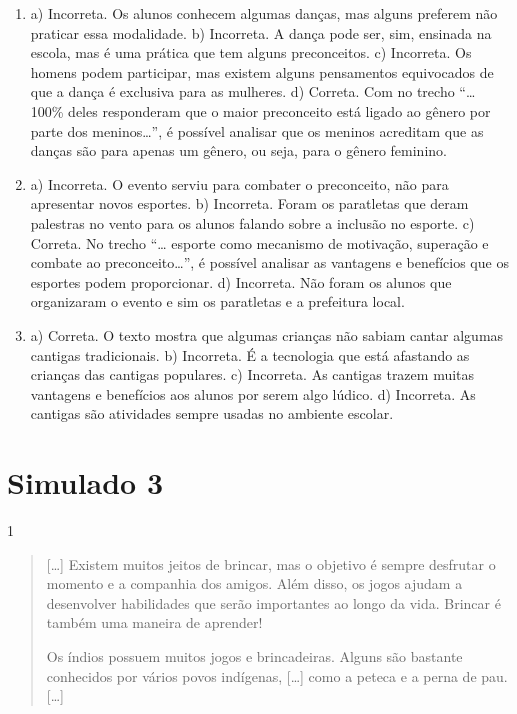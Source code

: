 

\begin{enumerate}

\item
a) Incorreta. Os alunos conhecem algumas danças, mas alguns preferem não praticar essa modalidade.
b) Incorreta. A dança pode ser, sim, ensinada na escola, mas é uma
prática que tem alguns preconceitos.
c) Incorreta. Os homens podem participar, mas existem alguns
pensamentos equivocados de que a dança é exclusiva para as mulheres.
d) Correta. Com no trecho “\ldots{} 100\% deles responderam que o maior
preconceito está ligado ao gênero por parte dos meninos\ldots{}”, é possível
analisar que os meninos acreditam que as danças são para apenas um
gênero, ou seja, para o gênero feminino.

\item
a) Incorreta. O evento serviu para combater o preconceito, não
para apresentar novos esportes.
b) Incorreta. Foram os paratletas que deram palestras no vento
para os alunos falando sobre a inclusão no esporte.
c) Correta. No trecho “\ldots{} esporte como mecanismo de motivação,
superação e combate ao preconceito\ldots{}”, é possível analisar as vantagens
e benefícios que os esportes podem proporcionar.
d) Incorreta. Não foram os alunos que organizaram o evento e sim
os paratletas e a prefeitura local.

\item
a) Correta. O texto mostra que algumas crianças não sabiam cantar
algumas cantigas tradicionais.
b) Incorreta. É a tecnologia que está afastando as crianças das
cantigas populares.
c) Incorreta. As cantigas trazem muitas vantagens e benefícios
aos alunos por serem algo lúdico.
d) Incorreta. As cantigas são atividades sempre usadas no ambiente escolar.
\end{enumerate}

\chapter{Simulado 3}

\num{1}
\begin{quote}
  {[}\ldots{}{]} Existem muitos jeitos de brincar, mas o objetivo é sempre desfrutar o
  momento e a companhia dos amigos. Além disso, os jogos ajudam a
  desenvolver habilidades que serão importantes ao longo da vida.
  Brincar é também uma maneira de aprender!

Os índios possuem muitos jogos e brincadeiras. Alguns são bastante
conhecidos por vários povos indígenas, {[}\ldots{}{]} como a peteca e a perna
de pau. {[}\ldots{}{]}

\end{quote}

